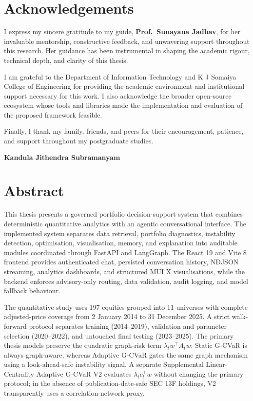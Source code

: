 \documentclass[11pt]{article}
\newcommand{\thesisauthor}{Kandula Jithendra Subramanyam}
\newcommand{\thesisguide}{Prof.\ Sunayana Jadhav}
\begin{document}
\clearpage
\section*{Acknowledgements}
I express my sincere gratitude to my guide, \textbf{\thesisguide}, for her invaluable mentorship, constructive feedback, and unwavering support throughout this research. Her guidance has been instrumental in shaping the academic rigour, technical depth, and clarity of this thesis.

I am grateful to the Department of Information Technology and K J Somaiya College of Engineering for providing the academic environment and institutional support necessary for this work. I also acknowledge the broader open-source ecosystem whose tools and libraries made the implementation and evaluation of the proposed framework feasible.

Finally, I thank my family, friends, and peers for their encouragement, patience, and support throughout my postgraduate studies.

\vspace{1.5cm}
\noindent\textbf{\thesisauthor}

\clearpage
\section*{Abstract}
This thesis presents a governed portfolio decision-support system that combines deterministic quantitative analytics with an agentic conversational interface. The implemented system separates data retrieval, portfolio diagnostics, instability detection, optimisation, visualisation, memory, and explanation into auditable modules coordinated through FastAPI and LangGraph. The React 19 and Vite 8 frontend provides authenticated chat, persisted conversation history, NDJSON streaming, analytics dashboards, and structured MUI X visualisations, while the backend enforces advisory-only routing, data validation, audit logging, and model fallback behaviour.

The quantitative study uses 197 equities grouped into 11 universes with complete adjusted-price coverage from 2 January 2014 to 31 December 2025. A strict walk-forward protocol separates training (2014--2019), validation and parameter selection (2020--2022), and untouched final testing (2023--2025). The primary thesis models preserve the quadratic graph-risk term $\lambda_t w^\top A_t w$: Static G-CVaR is always graph-aware, whereas Adaptive G-CVaR gates the same graph mechanism using a look-ahead-safe instability signal. A separate Supplemental Linear-Centrality Adaptive G-CVaR V2 evaluates $\lambda_t c_t^\top w$ without changing the primary protocol; in the absence of publication-date-safe SEC 13F holdings, V2 transparently uses a correlation-network proxy.
\end{document}
